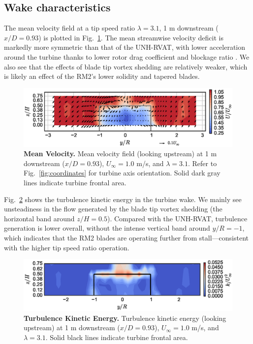 \documentclass[10pt,letterpaper]{article}
\begin{document}
\subsection*{Wake characteristics}

The mean velocity field at a tip speed ratio $\lambda=3.1$, 1 m downstream
($x/D=0.93$) is plotted in Fig.~\ref{fig:meancontquiv}. The mean streamwise
velocity deficit is markedly more symmetric than that of the UNH-RVAT, with
lower acceleration around the turbine thanks to lower rotor drag coefficient and
blockage ratio \cite{Bachant2015-JoT}. We also see that the effects of blade tip
vortex shedding are relatively weaker, which is likely an effect of the RM2's
lower solidity and tapered blades.

\begin{figure}[h]
    \includegraphics[width=\textwidth]{figures/meancontquiv.eps}

    \caption{{\bf Mean Velocity.} Mean velocity field (looking upstream) at 1 m
    downstream ($x/D=0.93$), $U_\infty=1.0$ m/s, and $\lambda=3.1$. Refer to
    Fig.~\ref{fig:coordinates} for turbine axis orientation. Solid dark gray
    lines indicate turbine frontal area.}

    \label{fig:meancontquiv}
\end{figure}


Fig.~\ref{fig:kcont} shows the turbulence kinetic energy in the turbine wake. We
mainly see unsteadiness in the flow generated by the blade tip vortex shedding
(the horizontal band around $z/H=0.5$). Compared with the UNH-RVAT, turbulence
generation is lower overall, without the intense vertical band around $y/R=-1$,
which indicates that the RM2 blades are operating further from
stall---consistent with the higher tip speed ratio operation.

\begin{figure}[h]
    \includegraphics[width=\textwidth]{figures/k_contours.eps}

    \caption{{\bf Turbulence Kinetic Energy.} Turbulence kinetic energy (looking
    upstream) at 1 m downstream ($x/D=0.93$), $U_\infty=1.0$ m/s, and
    $\lambda=3.1$. Solid black lines indicate turbine frontal area.}

    \label{fig:kcont}
\end{figure}
\end{document}
